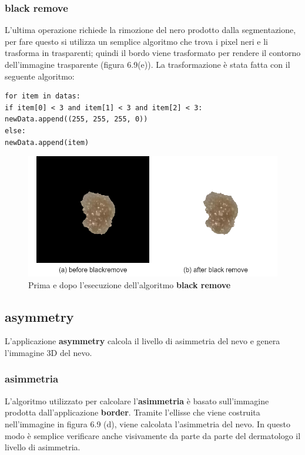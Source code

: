 {\subsubsection{black remove}
L'ultima operazione richiede la rimozione del nero prodotto dalla segmentazione, per fare questo si utilizza un semplice algoritmo che trova i pixel neri e li trasforma in trasparenti; quindi il bordo viene trasformato per rendere il contorno dell'immagine trasparente (figura 6.9(e)). La trasformazione è stata fatta con il seguente algoritmo:
\begin{lstlisting}
for item in datas:
if item[0] < 3 and item[1] < 3 and item[2] < 3:
newData.append((255, 255, 255, 0))
else:
newData.append(item)
\end{lstlisting}
\begin{figure}[h]
	\begin{center}
		\includegraphics[scale=0.5]{figure/capitolo6/blackremove.png}
	\end{center}
	\caption{Prima e dopo l'esecuzione dell'algoritmo \textbf{black remove}}	
\end{figure}
\newpage
\subsection{asymmetry}
L'applicazione \textbf{asymmetry} calcola il livello di asimmetria del nevo e genera l'immagine 3D del nevo.
\subsubsection{asimmetria}
L'algoritmo utilizzato per calcolare l'\textbf{asimmetria} è basato sull'immagine prodotta dall'applicazione \textbf{border}.
Tramite l'ellisse che viene costruita nell'immagine in figura 6.9 (d), viene calcolata l'asimmetria del nevo. In questo modo è semplice verificare anche visivamente da parte da parte del dermatologo il livello di asimmetria.
\newline
}
